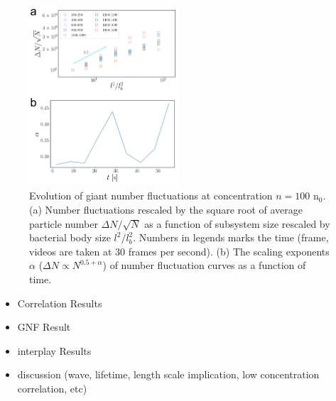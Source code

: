 \documentclass[twocolumn,aps,pre,amsmath,amssymb,floatfix,longbibliography]{revtex4-1}
\begin{document}
\begin{figure}[!]
\begin{center}
\includegraphics[width=0.5\textwidth]{GNF_kinetics_conbine.png}
\caption[]{Evolution of giant number fluctuations at concentration $n=100$ n$_0$. (a) Number fluctuations rescaled by the square root of average particle number $\Delta N/\sqrt N$ as a function of subsystem size rescaled by bacterial body size $l^2/l_b^2$. Numbers in legends marks the time (frame, videos are taken at 30 frames per second).  (b) The scaling exponents $\alpha$ ($\Delta N \propto N^{0.5+\alpha}$) of number fluctuation curves as a function of time.}
\label{fig:4}
\end{center}
\end{figure}

\begin{itemize}
\item Correlation Results
\item GNF Result
\item interplay Results
\item discussion (wave, lifetime, length scale implication, low concentration correlation, etc)
\end{itemize}
\end{document}
